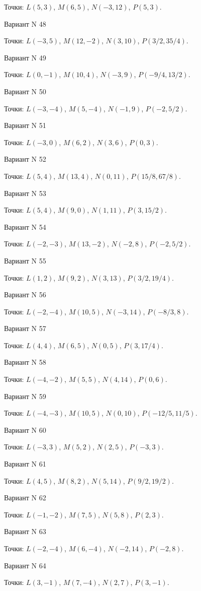 \documentclass[11pt]{report}
\begin{document}
Точки: $L(5, 3)$, $M(6, 5)$, $N(-3, 12)$, $P(5, 3)$.

Вариант N 48

Точки: $L(-3, 5)$, $M(12, -2)$, $N(3, 10)$, $P(3/2, 35/4)$.

Вариант N 49

Точки: $L(0, -1)$, $M(10, 4)$, $N(-3, 9)$, $P(-9/4, 13/2)$.

Вариант N 50

Точки: $L(-3, -4)$, $M(5, -4)$, $N(-1, 9)$, $P(-2, 5/2)$.

Вариант N 51

Точки: $L(-3, 0)$, $M(6, 2)$, $N(3, 6)$, $P(0, 3)$.

Вариант N 52

Точки: $L(5, 4)$, $M(13, 4)$, $N(0, 11)$, $P(15/8, 67/8)$.

Вариант N 53

Точки: $L(5, 4)$, $M(9, 0)$, $N(1, 11)$, $P(3, 15/2)$.

Вариант N 54

Точки: $L(-2, -3)$, $M(13, -2)$, $N(-2, 8)$, $P(-2, 5/2)$.

Вариант N 55

Точки: $L(1, 2)$, $M(9, 2)$, $N(3, 13)$, $P(3/2, 19/4)$.

Вариант N 56

Точки: $L(-2, -4)$, $M(10, 5)$, $N(-3, 14)$, $P(-8/3, 8)$.

Вариант N 57

Точки: $L(4, 4)$, $M(6, 5)$, $N(0, 5)$, $P(3, 17/4)$.

Вариант N 58

Точки: $L(-4, -2)$, $M(5, 5)$, $N(4, 14)$, $P(0, 6)$.

Вариант N 59

Точки: $L(-4, -3)$, $M(10, 5)$, $N(0, 10)$, $P(-12/5, 11/5)$.

Вариант N 60

Точки: $L(-3, 3)$, $M(5, 2)$, $N(2, 5)$, $P(-3, 3)$.

Вариант N 61

Точки: $L(4, 5)$, $M(8, 2)$, $N(5, 14)$, $P(9/2, 19/2)$.

Вариант N 62

Точки: $L(-1, -2)$, $M(7, 5)$, $N(5, 8)$, $P(2, 3)$.

Вариант N 63

Точки: $L(-2, -4)$, $M(6, -4)$, $N(-2, 14)$, $P(-2, 8)$.

Вариант N 64

Точки: $L(3, -1)$, $M(7, -4)$, $N(2, 7)$, $P(3, -1)$.
\end{document}
